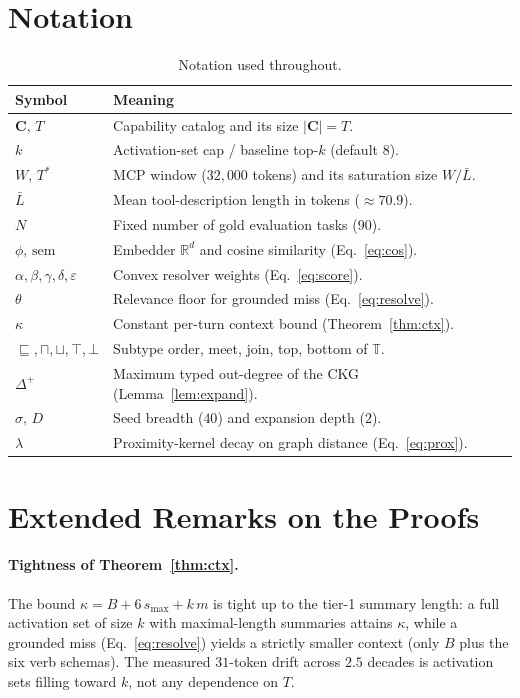 \documentclass[11pt]{article}
\theoremstyle{plain}
\theoremstyle{definition}
\begin{document}
\section{Notation}
\label{app:notation}
\begin{table}[h]
\centering
\small
\caption{Notation used throughout.}
\begin{tabular}{ll}
\toprule
Symbol & Meaning \\
\midrule
$\mathbf{C},\,T$ & Capability catalog and its size $|\mathbf{C}|=T$. \\
$k$ & Activation-set cap / baseline top-$k$ (default $8$). \\
$W,\,T^{*}$ & MCP window ($32{,}000$ tokens) and its saturation size $W/\bar L$. \\
$\bar L$ & Mean tool-description length in tokens ($\approx 70.9$). \\
$N$ & Fixed number of gold evaluation tasks ($90$). \\
$\phi,\,\mathrm{sem}$ & Embedder $\mathbb{R}^{d}$ and cosine similarity (Eq.~\eqref{eq:cos}). \\
$\alpha,\beta,\gamma,\delta,\varepsilon$ & Convex resolver weights (Eq.~\eqref{eq:score}). \\
$\theta$ & Relevance floor for grounded miss (Eq.~\eqref{eq:resolve}). \\
$\kappa$ & Constant per-turn context bound (Theorem~\ref{thm:ctx}). \\
$\sqsubseteq,\sqcap,\sqcup,\top,\bot$ & Subtype order, meet, join, top, bottom of $\mathbb{T}$. \\
$\Delta^{+}$ & Maximum typed out-degree of the CKG (Lemma~\ref{lem:expand}). \\
$\sigma,\,D$ & Seed breadth ($40$) and expansion depth ($2$). \\
$\lambda$ & Proximity-kernel decay on graph distance (Eq.~\eqref{eq:prox}). \\
\bottomrule
\end{tabular}
\end{table}

\section{Extended Remarks on the Proofs}
\label{app:proofs}
\paragraph{Tightness of Theorem~\ref{thm:ctx}.} The bound
$\kappa = B + 6\,s_{\max} + k\,m$ is tight up to the tier-1 summary length: a full
activation set of size $k$ with maximal-length summaries attains $\kappa$, while
a grounded miss (Eq.~\eqref{eq:resolve}) yields a strictly smaller context (only
$B$ plus the six verb schemas). The measured $31$-token drift across $2.5$
decades is activation sets filling toward $k$, not any dependence on $T$.
\end{document}
